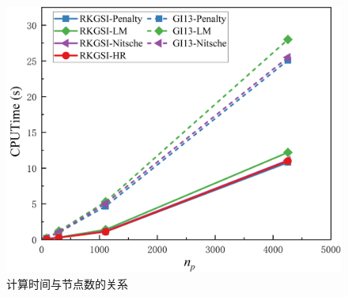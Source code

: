\begin{figure}[H]
    \centering
    \includegraphics[scale=0.5]{figure/E/cantilever/CPUTime.png}
    \caption{计算时间与节点数的关系}\label{CCPUTime}
\end{figure}
% 
